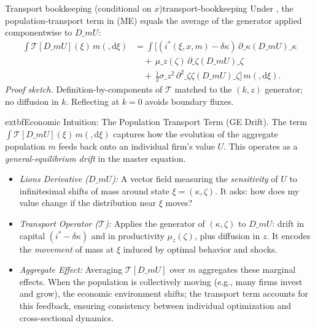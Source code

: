 \documentclass[11pt,letterpaper,oneside]{article}
\numberwithin{equation}{section}
\newcommand{\1}{\mathbf{1}}
\newcommand{\diff}{,\mathrm{d}}
\newcommand{\Dm}{D\_m}
\begin{document}
\begin{lemma}{Transport bookkeeping (conditional on $x$)}{transport-bookkeeping}
Under , the population-transport term in (ME) equals the average of the generator applied componentwise to $\Dm U$:
\[
\begin{aligned}
\int \mathcal{T}[\Dm U](\xi)\, m(\diff \xi)
&= \int \Big[(i^*(\xi,x,m)-\delta\kappa)\,\partial\_{\kappa}(\Dm U)\!\_\kappa \\
&\quad +\, \mu\_z(\zeta)\,\partial\_{\zeta}(\Dm U)\!\_\zeta \\
&\quad +\, \tfrac12\sigma\_z^2\,\partial^2\_{\zeta\zeta}(\Dm U)\!\_\zeta\Big] \, m(\diff \xi).
\end{aligned}
\]
\emph{Proof sketch.} Definition-by-components of $\mathcal{T}$ matched to the $(k,z)$ generator; no diffusion in $k$. Reflecting at $k=0$ avoids boundary fluxes.
\end{lemma}

\begin{tcolorbox}[didacticstyle]
  	extbf{Economic Intuition: The Population Transport Term (GE Drift).}
The term $\int \mathcal{T}[\Dm U](\xi)\, m(\diff \xi)$ captures how the evolution of the aggregate population $m$ feeds back onto an individual firm's value $U$. This operates as a \emph{general-equilibrium drift} in the master equation.
\begin{itemize}[leftmargin=1.15em,itemsep=0.25em]
  \item \emph{Lions Derivative ($\Dm U$):} A vector field measuring the \emph{sensitivity} of $U$ to infinitesimal shifts of mass around state $\xi=(\kappa,\zeta)$. It asks: how does my value change if the distribution near $\xi$ moves?
  \item \emph{Transport Operator ($\mathcal{T}$):} Applies the generator of $(\kappa,\zeta)$ to $\Dm U$: drift in capital $(i^*-\delta\kappa)$ and in productivity $\mu_z(\zeta)$, plus diffusion in $z$. It encodes the \emph{movement} of mass at $\xi$ induced by optimal behavior and shocks.
  \item \emph{Aggregate Effect:} Averaging $\mathcal{T}[\Dm U]$ over $m$ aggregates these marginal effects. When the population is collectively moving (e.g., many firms invest and grow), the economic environment shifts; the transport term accounts for this feedback, ensuring consistency between individual optimization and cross-sectional dynamics.
\end{itemize}
\end{tcolorbox}
\end{document}
